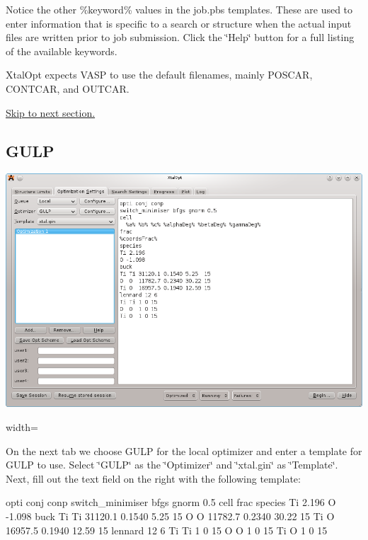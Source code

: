 Notice the other \%keyword\% values in the job.\-pbs templates. These are used to enter information that is specific to a search or structure when the actual input files are written prior to job submission. Click the \char`\"{}\-Help\char`\"{} button for a full listing of the available keywords.

Xtal\-Opt expects V\-A\-S\-P to use the default filenames, mainly P\-O\-S\-C\-A\-R, C\-O\-N\-T\-C\-A\-R, and O\-U\-T\-C\-A\-R.

\hyperlink{tut-xo_qisetup}{Skip to next section.}\hypertarget{tut-xo_gulp-opt}{}\subsection{G\-U\-L\-P}\label{tut-xo_gulp-opt}
 
\begin{DoxyImage}
\includegraphics{opt-set-gulp.png}
\caption{width=}
\end{DoxyImage}


On the next tab we choose G\-U\-L\-P for the local optimizer and enter a template for G\-U\-L\-P to use. Select \char`\"{}\-G\-U\-L\-P\char`\"{} as the \char`\"{}\-Optimizer\char`\"{} and \char`\"{}xtal.\-gin\char`\"{} as \char`\"{}\-Template\char`\"{}. Next, fill out the text field on the right with the following template\-: 
\begin{DoxyCode}
opti conj conp
switch\_minimiser bfgs gnorm 0.5
cell
frac
species
Ti 2.196
O -1.098
buck
Ti Ti 31120.1 0.1540 5.25  15
O  O  11782.7 0.2340 30.22 15
Ti O  16957.5 0.1940 12.59 15
lennard 12 6
Ti Ti 1 0 15
O  O  1 0 15
Ti O  1 0 15
\end{DoxyCode}


